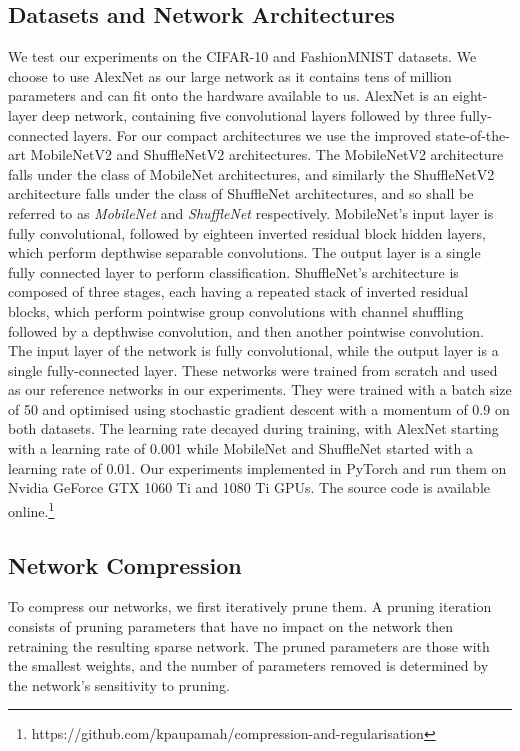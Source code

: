 \documentclass[conference]{IEEEtran}
\begin{document}
\subsection{Datasets and Network Architectures}
We test our experiments on the CIFAR-10 \cite{krizhevsky2014cifar} and FashionMNIST \cite{xiao2017fashion} datasets. We choose to use AlexNet \cite{krizhevsky2012imagenet} as our large network as it contains tens of million parameters and can fit onto the hardware available to us. AlexNet is an eight-layer deep network, containing five convolutional layers followed by three fully-connected layers. For our compact architectures we use the improved state-of-the-art MobileNetV2 \cite{sandler2018mobilenetv2} and ShuffleNetV2 \cite{ma2018shufflenetv2} architectures. The MobileNetV2 architecture falls under the class of MobileNet architectures, and similarly the ShuffleNetV2 architecture falls under the class of ShuffleNet architectures, and so shall be referred to as \emph{MobileNet} and \emph{ShuffleNet} respectively. MobileNet's input layer is fully convolutional, followed by eighteen inverted residual block hidden layers, which perform depthwise separable convolutions. The output layer is a single fully connected layer to perform classification. ShuffleNet's architecture is composed of three stages, each having a repeated stack of inverted residual blocks, which perform pointwise group convolutions with channel shuffling followed by a depthwise convolution, and then another pointwise convolution. The input layer of the network is fully convolutional, while the output layer is a single fully-connected layer. 
These networks were trained from scratch and used as our reference networks in our experiments. They were trained with a batch size of 50 and optimised using stochastic gradient descent with a momentum of 0.9 on both datasets. The learning rate decayed during training, with AlexNet starting with a learning rate of 0.001 while MobileNet and ShuffleNet started with a learning rate of 0.01. Our experiments implemented in PyTorch \cite{paszke2017pytorch} and run them on Nvidia GeForce GTX 1060 Ti and 1080 Ti GPUs. The source code is available online.\footnote{https://github.com/kpaupamah/compression-and-regularisation}


\subsection{Network Compression} 
To compress our networks, we first iteratively prune them. A pruning iteration consists of pruning parameters that have no impact on the network then retraining the resulting sparse network. The pruned parameters are those with the smallest weights, and the number of parameters removed is determined by the network's sensitivity to pruning. 
\end{document}
